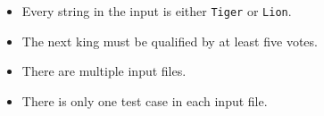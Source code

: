 \begin{itemize}
\tightlist
\item Every string in the input is either \verb+Tiger+ or \verb+Lion+. 
\item The next king must be qualified by at least five votes.
\item There are multiple input files.
\item There is only one test case in each input file.
\end{itemize}
\newpage
